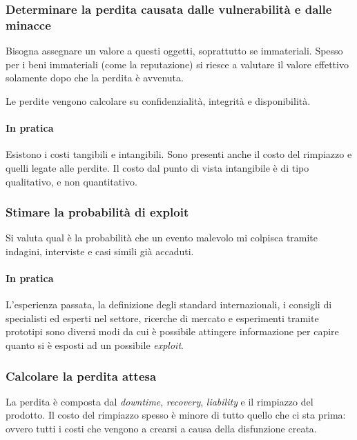 \subsubsection{Determinare la perdita causata dalle vulnerabilità e dalle
minacce}

Bisogna assegnare un valore a questi oggetti, soprattutto se immateriali.
Spesso per i beni immateriali (come la reputazione) si riesce a valutare il
valore effettivo solamente dopo che la perdita è avvenuta.

Le perdite vengono calcolare su confidenzialità, integrità e disponibilità.

\paragraph*{In pratica}

Esistono i costi tangibili e intangibili. Sono presenti anche il costo del
rimpiazzo e quelli legate alle perdite.
Il costo dal punto di vista intangibile è di tipo qualitativo, e non
quantitativo.


\subsubsection{Stimare la probabilità di exploit}

Si valuta qual è la probabilità che un evento malevolo mi colpisca tramite
indagini, interviste e casi simili già accaduti.

\paragraph*{In pratica}

L'esperienza passata, la definizione degli standard internazionali, i consigli
di specialisti ed esperti nel settore, ricerche di mercato e esperimenti
tramite prototipi sono diversi modi da cui è possibile attingere
informazione per capire quanto si è esposti ad un possibile \textit{exploit}.



\subsubsection{Calcolare la perdita attesa}

La perdita è composta dal \textit{downtime}, \textit{recovery},
\textit{liability} e il rimpiazzo del prodotto. Il costo del rimpiazzo spesso è
minore di tutto quello che ci sta prima: ovvero tutti i costi che vengono a
crearsi a causa della disfunzione creata.

